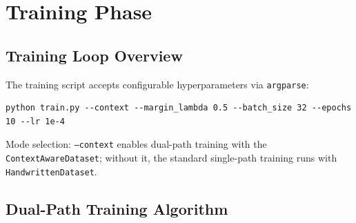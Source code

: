 \documentclass[11pt, a4paper]{report}
\begin{document}
\chapter{Training Phase}
\label{ch:training}

\section{Training Loop Overview}
\label{sec:training-overview}

The training script accepts configurable hyperparameters via \texttt{argparse}:

\begin{lstlisting}[style=pythonstyle, frame=single, numbers=none]
python train.py --context --margin_lambda 0.5 --batch_size 32 --epochs 10 --lr 1e-4
\end{lstlisting}

Mode selection: \texttt{--context} enables dual-path training with the \texttt{ContextAwareDataset}; without it, the standard single-path training runs with \texttt{HandwrittenDataset}.

\section{Dual-Path Training Algorithm}
\label{sec:algorithm}
\end{document}
